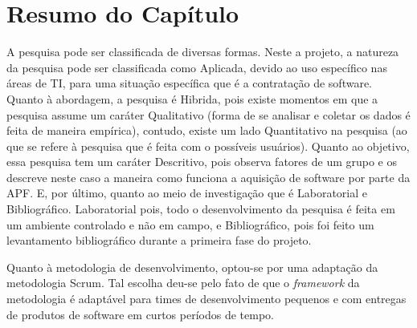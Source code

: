 \section{Resumo do Capítulo}
A pesquisa pode ser classificada de diversas formas. Neste a projeto, a natureza da pesquisa pode ser classificada como Aplicada, devido ao uso específico nas áreas de TI, para uma situação específica que é a contratação de software. Quanto à abordagem, a pesquisa é Hibrida, pois existe momentos em que a pesquisa assume um caráter Qualitativo (forma de se analisar e coletar os dados é feita de maneira empírica), contudo, existe um lado Quantitativo na pesquisa (ao que se refere à pesquisa que é feita com o possíveis usuários). Quanto ao objetivo, essa pesquisa tem um caráter Descritivo, pois observa fatores de um grupo e os descreve neste caso a maneira como funciona a aquisição de software por parte da APF. E, por último, quanto ao meio de investigação que é Laboratorial e Bibliográfico. Laboratorial pois, todo o desenvolvimento da pesquisa é feita em um ambiente controlado e não em campo, e Bibliográfico, pois foi feito um levantamento bibliográfico durante a primeira fase do projeto.

Quanto à metodologia de desenvolvimento, optou-se por uma adaptação da metodologia Scrum. Tal escolha deu-se pelo fato de que o \textit{framework} da metodologia é adaptável para times de desenvolvimento pequenos e com entregas de produtos de software em curtos períodos de tempo.
